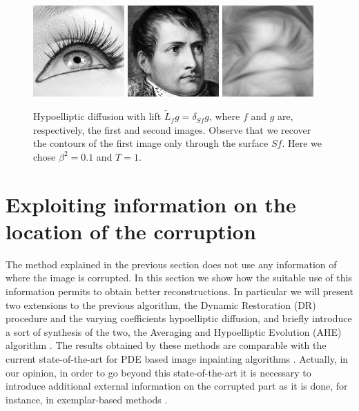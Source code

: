 \documentclass[proc]{edpsmath}
\begin{document}
\begin{figure}
  \includegraphics[height=3.5cm]{imgs/eye}\qquad
  \includegraphics[height=3.5cm]{imgs/napo-orig}\qquad
  \includegraphics[height=3.5cm]{imgs/napoleon-eye}
  \caption{Hypoelliptic diffusion with lift $\tilde{ L}_f g = \delta_{Sf}g$, where $f$ and $g$ are, respectively, the first and second images. Observe that we recover the contours of the first image only through the surface $Sf$. Here we chose $\beta^2 = 0.1$ and $T=1$.}
  \label{fig:PH-no-val}
\end{figure}


\section{Exploiting information on the location of the corruption}\label{s-corr}

The method explained in the previous section does not use any information of where the image is corrupted. In this section we show how the suitable use of this information permits to obtain better reconstructions. In particular we will present two extensions to the previous algorithm, the Dynamic Restoration (DR) procedure \cite{Remizov2013} and the varying coefficients hypoelliptic diffusion, and briefly introduce a sort of synthesis of the two, the Averaging and Hypoelliptic Evolution (AHE) algorithm \cite{ahe}. The results obtained by these methods are comparable with the current state-of-the-art for PDE based image inpainting algorithms \cite{Facciolo,cao}.
  Actually, in our opinion, in order to go beyond this state-of-the-art it is necessary to introduce additional external information on the corrupted part as it is done, for instance, in exemplar-based methods \cite{cao}.
\end{document}
